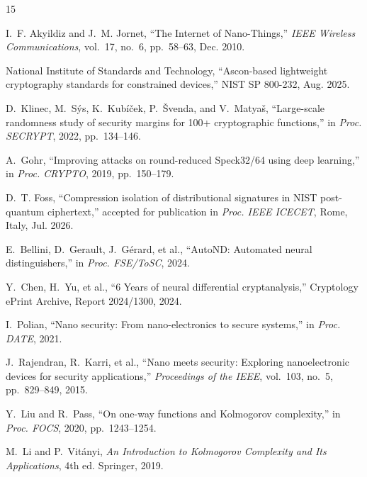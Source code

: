 \documentclass[conference]{IEEEtran}
\begin{document}


\begin{thebibliography}{15}

I.~F. Akyildiz and J.~M. Jornet, ``The Internet of Nano-Things,''
\textit{IEEE Wireless Communications}, vol.~17, no.~6, pp.~58--63, Dec. 2010.

National Institute of Standards and Technology, ``Ascon-based lightweight cryptography standards for constrained devices,''
NIST SP 800-232, Aug. 2025.

D.~Klinec, M.~S\'{y}s, K.~Kubí\v{c}ek, P.~\v{S}venda, and V.~Matya\v{s},
``Large-scale randomness study of security margins for 100+ cryptographic functions,''
in \textit{Proc. SECRYPT}, 2022, pp.~134--146.

A.~Gohr, ``Improving attacks on round-reduced Speck32/64 using deep learning,''
in \textit{Proc. CRYPTO}, 2019, pp.~150--179.

D.~T. Foss, ``Compression isolation of distributional signatures in NIST post-quantum ciphertext,''
accepted for publication in \textit{Proc. IEEE ICECET}, Rome, Italy, Jul. 2026.

E.~Bellini, D.~Gerault, J.~G\'{e}rard, et al.,
``AutoND: Automated neural distinguishers,''
in \textit{Proc. FSE/ToSC}, 2024.

Y.~Chen, H.~Yu, et al.,
``6 Years of neural differential cryptanalysis,''
Cryptology ePrint Archive, Report 2024/1300, 2024.

I.~Polian, ``Nano security: From nano-electronics to secure systems,''
in \textit{Proc. DATE}, 2021.

J.~Rajendran, R.~Karri, et al.,
``Nano meets security: Exploring nanoelectronic devices for security applications,''
\textit{Proceedings of the IEEE}, vol.~103, no.~5, pp.~829--849, 2015.

Y.~Liu and R.~Pass, ``On one-way functions and Kolmogorov complexity,''
in \textit{Proc. FOCS}, 2020, pp.~1243--1254.

M.~Li and P.~Vitányi, \textit{An Introduction to Kolmogorov Complexity and Its Applications},
4th ed. Springer, 2019.


\end{thebibliography}
\end{document}
